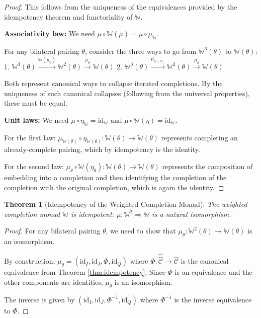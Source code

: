 \documentclass[11pt]{article}
\theoremstyle{plain}
\newtheorem{theorem}{Theorem}[section]
\theoremstyle{definition}
\theoremstyle{remark}
\newcommand{\C}{\mathcal{C}}
\newcommand{\id}{\mathrm{id}}
\newcommand{\wh}[1]{\widehat{#1}}
\begin{document}
\begin{proof}
This follows from the uniqueness of the equivalences provided by the idempotency theorem and functoriality of $\mathbb{W}$.

\textbf{Associativity law:} We need $\mu \circ \mathbb{W}(\mu) = \mu \circ \mu_{\mathbb{W}}$. 

For any bilateral pairing $\theta$, consider the three ways to go from $\mathbb{W}^3(\theta)$ to $\mathbb{W}(\theta)$:
1. $\mathbb{W}^3(\theta) \xrightarrow{\mathbb{W}(\mu_\theta)} \mathbb{W}^2(\theta) \xrightarrow{\mu_\theta} \mathbb{W}(\theta)$
2. $\mathbb{W}^3(\theta) \xrightarrow{\mu_{\mathbb{W}(\theta)}} \mathbb{W}^2(\theta) \xrightarrow{\mu_\theta} \mathbb{W}(\theta)$

Both represent canonical ways to collapse iterated completions. By the uniqueness of such canonical collapses (following from the universal properties), these must be equal.

\textbf{Unit laws:} We need $\mu \circ \eta_{\mathbb{W}} = \id_{\mathbb{W}}$ and $\mu \circ \mathbb{W}(\eta) = \id_{\mathbb{W}}$.

For the first law: $\mu_{\mathbb{W}(\theta)} \circ \eta_{\mathbb{W}(\theta)} : \mathbb{W}(\theta) \to \mathbb{W}(\theta)$ represents completing an already-complete pairing, which by idempotency is the identity.

For the second law: $\mu_\theta \circ \mathbb{W}(\eta_\theta) : \mathbb{W}(\theta) \to \mathbb{W}(\theta)$ represents the composition of embedding into a completion and then identifying the completion of the completion with the original completion, which is again the identity.
\end{proof}

\begin{theorem}[Idempotency of the Weighted Completion Monad]\label{thm:monad-idempotent}
The weighted completion monad $\mathbb{W}$ is idempotent: $\mu : \mathbb{W}^2 \Rightarrow \mathbb{W}$ is a natural isomorphism.
\end{theorem}

\begin{proof}
For any bilateral pairing $\theta$, we need to show that $\mu_\theta : \mathbb{W}^2(\theta) \to \mathbb{W}(\theta)$ is an isomorphism.

By construction, $\mu_\theta = (\id_I, \id_J, \Phi, \id_Q)$ where $\Phi : \wh{\wh{\C}} \to \wh{\C}$ is the canonical equivalence from Theorem \ref{thm:idempotency}. Since $\Phi$ is an equivalence and the other components are identities, $\mu_\theta$ is an isomorphism.

The inverse is given by $(\id_I, \id_J, \Phi^{-1}, \id_Q)$ where $\Phi^{-1}$ is the inverse equivalence to $\Phi$.
\end{proof}
\end{document}
